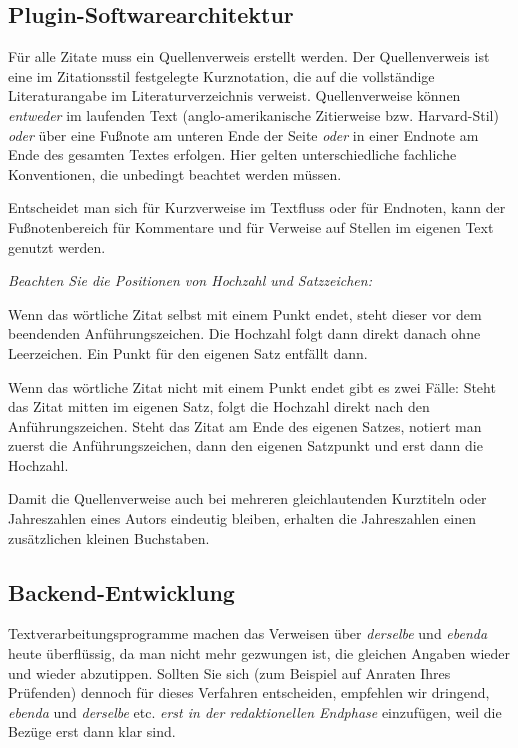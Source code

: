 \subsection{Plugin-Softwarearchitektur}
Für alle Zitate muss ein Quellenverweis erstellt werden. Der Quellenverweis ist eine im Zitationsstil festgelegte Kurznotation, die auf die vollständige Literaturangabe im Literaturverzeichnis verweist. Quellenverweise können \emph{entweder} im laufenden Text (anglo-amerikanische Zitierweise bzw. Harvard-Stil) \emph{oder} über eine Fußnote am unteren Ende der Seite \emph{oder} in einer Endnote am Ende des gesamten Textes erfolgen. Hier gelten unterschiedliche fachliche Konventionen, die unbedingt beachtet werden müssen.
\par
Entscheidet man sich für Kurzverweise im Textfluss oder für Endnoten, kann der Fußnotenbereich für Kommentare und für Verweise auf Stellen im eigenen Text genutzt werden.
\par
\emph{Beachten Sie die Positionen von Hochzahl und Satzzeichen:}
\par
Wenn das wörtliche Zitat selbst mit einem Punkt endet, steht dieser vor dem beendenden Anführungszeichen. Die Hochzahl folgt dann direkt danach ohne Leerzeichen. Ein Punkt für den eigenen Satz entfällt dann.
\par
Wenn das wörtliche Zitat nicht mit einem Punkt endet gibt es zwei Fälle: Steht das Zitat mitten im eigenen Satz, folgt die Hochzahl direkt nach den Anführungszeichen. Steht das Zitat am Ende des eigenen Satzes, notiert man zuerst die Anführungszeichen, dann den eigenen Satzpunkt und erst dann die Hochzahl.
\par
Damit die Quellenverweise auch bei mehreren gleichlautenden Kurztiteln oder Jahreszahlen eines Autors eindeutig bleiben, erhalten die Jahreszahlen einen zusätzlichen kleinen Buchstaben.
%
\subsection{Backend-Entwicklung}
Textverarbeitungsprogramme machen das Verweisen über \emph{derselbe} und \emph{ebenda} heute überflüssig, da man nicht mehr gezwungen ist, die gleichen Angaben wieder und wieder abzutippen. Sollten Sie sich (zum Beispiel auf Anraten Ihres Prüfenden) dennoch für dieses Verfahren entscheiden, empfehlen wir dringend, \emph{ebenda} und \emph{derselbe} etc. \emph{erst in der redaktionellen Endphase} einzufügen, weil die Bezüge erst dann klar sind.

